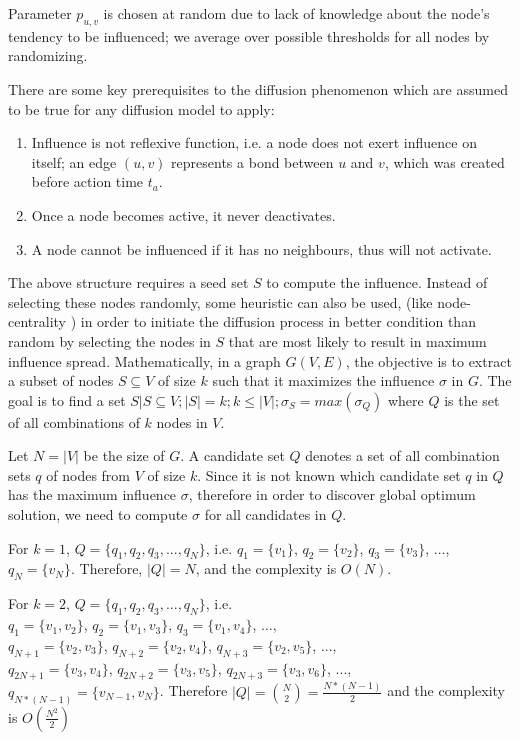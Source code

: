 	Parameter $p_{u,v}$ is chosen at random due to lack of knowledge about the node's tendency to be influenced; we average over possible thresholds for all nodes by randomizing.
	
	There are some key prerequisites to the diffusion phenomenon which are assumed to be true for any diffusion model to apply:
	\begin{enumerate}
		\item Influence is not reflexive function, i.e. a node does not exert influence on itself; an edge $(u,v)$ represents a bond between $u$ and $v$, which was created before action time $t_a$.
		
		\item Once a node becomes active, it never deactivates.
		
		\item A node cannot be influenced if it has no neighbours, thus will not activate.
	\end{enumerate}
	
	The above structure requires a seed set $S$ to compute the influence. Instead of selecting these nodes randomly, some heuristic can also be used, (like node-centrality \cite{freeman1979}) in order to initiate the diffusion process in better condition than random by selecting the nodes in $S$ that are most likely to result in maximum influence spread. Mathematically, in a graph $G(V,E)$, the objective is to extract a subset of nodes $S\subseteq V$ of size $k$ such that it maximizes the influence $\sigma$ in $G$. The goal is to find a set $S|S\subseteq V;|S|=k;k\leq |V|;\sigma_S=max(\sigma_Q)$ where $Q$ is the set of all combinations of $k$ nodes in $V$.
	
	Let $N=|V|$ be the size of $G$. A candidate set $Q$ denotes a set of all combination sets $q$ of nodes from $V$ of size $k$. Since it is not known which candidate set $q$ in $Q$ has the maximum influence $\sigma$, therefore in order to discover global optimum solution, we need to compute $\sigma$ for all candidates in $Q$.
	
	For $k=1$, $Q=\{q_1,q_2,q_3,...,q_N\}$, i.e. $q_1=\{v_1\}$, $q_2=\{v_2\}$, $q_3=\{v_3\}$, ..., $q_N=\{v_N\}$. Therefore, $|Q|=N$, and the complexity is $O(N)$.
	
	For $k=2$, $Q=\{q_1,q_2,q_3,...,q_N\}$, i.e. \\
	$q_1=\{v_1,v_2\}$, $q_2=\{v_1,v_3\}$, $q_3=\{v_1,v_4\}$, ..., \\
	$q_{N+1}=\{v_2,v_3\}$, $q_{N+2}=\{v_2,v_4\}$, $q_{N+3}=\{v_2,v_5\}$, ..., \\
	$q_{2N+1}=\{v_3,v_4\}$, $q_{2N+2}=\{v_3,v_5\}$, $q_{2N+3}=\{v_3,v_6\}$, ..., \\
	$q_{N*(N-1)}=\{v_{N-1},v_N\}$. Therefore $|Q|={N\choose 2}=\frac{N*(N-1)}{2}$ and the complexity is $O(\frac{N^2}{2})$
	
